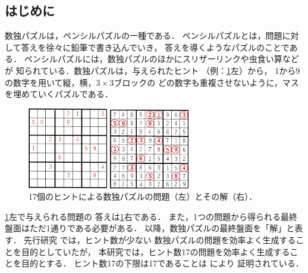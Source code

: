 \documentclass[a4paper, 9pt]{jarticle}
\begin{document}
\small

\twocolumn[\vspace*{29mm}] %
\begin{論文概要}           %

\section{はじめに}
数独パズルは，ペンシルパズルの一種である．
ペンシルパズルとは，問題に対して答えを徐々に鉛筆で書き込んでいき，
答えを導くようなパズルのことである．
ペンシルパズルには，数独パズルのほかにスリザーリンクや虫食い算などが
知られている．数独パズルは，与えられたヒント
（例：\figurename{\ref{fig:problem_and_answer}}左）から，
1から9の数字を用いて縦，横，$3 \times 3$ブロックの
どの数字も重複させないように，マスを埋めていくパズルである．
\begin{figure}[b]
  \begin{minipage}[b]{0.49\linewidth}
    \centering
    \includegraphics[width=3.5cm]{問題.png}
  \end{minipage}
  \begin{minipage}[b]{0.49\linewidth}
    \centering
    \includegraphics[width=3.5cm]{回答.png}
  \end{minipage}
  \caption{17個のヒントによる数独パズルの問題（左）とその解（右）．}
  \label{fig:problem_and_answer}
\end{figure}
\figurename{\ref{fig:problem_and_answer}}左で与えられる問題の
答えは\figurename{\ref{fig:problem_and_answer}}右である．
また，1つの問題から得られる最終盤面はただ1通りである必要がある．
以降，数独パズルの最終盤面を「解」と表す．
先行研究 \cite{previous_research} では，ヒント数が少ない
数独パズルの問題を効率よく生成することを目的としていたが，
本研究では，ヒント数17の問題を効率よく生成することを目的とする．
ヒント数17の下限は17であることは \cite{seventeen_hints} により
証明されている．


\end{論文概要}
\end{document}
